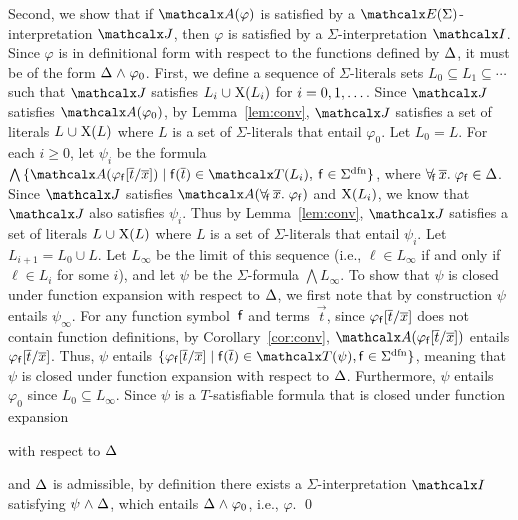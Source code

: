 \begin{proofsketch}
Second, we show that if $\conv( \varphi )$ is satisfied by a
$\extendsig{\Sigma}$-interpretation $\J$, then $\varphi$ is satisfied by a
$\Sigma$-interpretation $\I$. Since $\varphi$ is in definitional form with
respect to the functions defined by $\DDD$, it must be of the form
$\DDD \wedge \varphi_0$. 
First, we define a sequence of $\Sigma$-literals sets $L_0 \subseteq L_1 \subseteq \cdots$
such that $\J$ satisfies $L_i \cup \absconstraints( L_i )$ for $i = 0, 1, \ldots\vthinspace$.
Since $\J$ satisfies $\conv( \varphi_0 )$,
by Lemma~\ref{lem:conv}, 
$\J$ satisfies a set of literals $L \cup \absconstraints( L )$ where $L$ is a set of $\Sigma$-literals that entail $\varphi_0$.
Let $L_0 = L$.
For each $i \geq 0$,
let $\psi_i$ be the formula $\bigwedge\, \{ \conv( \varphi_{\con{f}}[ \vec t / \vec x ] ) \mid \con{f}( \vec t ) \in \terms( L_i ),\: \con{f} \in \sfundefs{\Sigma} \}$,
where $\forallf{\con{f}} \vec x.\; \varphi_{\con{f}} \in \DDD$.
Since $\J$ satisfies $\conv( \forallf{\con{f}} \vec x.\; \varphi_{\con{f}} )$ and $\mathrm{X}( L_i )$,
we know that $\J$ also satisfies $\psi_i$.
Thus by Lemma~\ref{lem:conv},
$\J$ satisfies a set of literals $L \cup \absconstraints( L )$ where $L$ is a set of $\Sigma$-literals that entail $\psi_i$.
Let $L_{i+1} = L_0 \cup L$.
Let $L_\infty$ be the limit of this sequence (i.e., $\ell \in L_\infty$ if and only if
$\ell \in L_i$ for some $i$),
and let $\psi$ be the $\Sigma$-formula $\bigwedge L_\infty$.
To show that $\psi$ is closed under function expansion with respect to $\DDD$,
we first note that by construction $\psi$ entails $\psi_\infty$.
For any function symbol~$\mathsf{f}$ and terms~$\vec t$, since $\varphi_{\mathsf{f}}[ \overline{t} / \overline{x} ]$ does not contain function definitions,
by Corollary~\ref{cor:conv},
$\conv( \varphi_{\con{f}}[ \vec t / \vec x ] )$ entails $\varphi_{\mathsf{f}}[ \overline{t} / \overline{x} ]$.
Thus, $\psi$ entails $\{ \varphi_{\con{f}}[ \vec t / \vec x ] \mid \con{f}( \vec t ) \in \terms( \psi ), \con{f} \in \sfundefs{\Sigma} \}$,
meaning that $\psi$ is closed under function expansion with respect to $\DDD$.
Furthermore, $\psi$ entails $\varphi_0$ since $L_0 \subseteq L_\infty$.
Since $\psi$ is a $T$-satisfiable formula that is closed under function expansion\begin{rep} with respect to $\DDD$\end{rep} and $\DDD$ is admissible, 
by definition there exists a $\Sigma$-interpretation $\I$ satisfying $\psi \wedge \DDD$, which entails $\DDD \wedge \varphi_0$,
i.e., $\varphi$.
\qed
\end{proofsketch}

